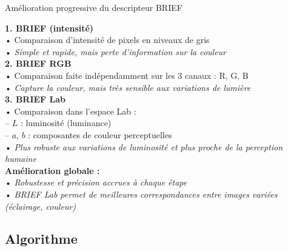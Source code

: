 \begin{frame}{Amélioration progressive du descripteur BRIEF}
\small

\textbf{1. BRIEF (intensité)} \\
\hspace{1em}• Comparaison d’intensité de pixels en niveaux de gris \\
\hspace{1em}• \textit{Simple et rapide, mais perte d'information sur la couleur} \\

\pause
\vspace{0.5em}
\textbf{2. BRIEF RGB} \\
\hspace{1em}• Comparaison faite indépendamment sur les 3 canaux : R, G, B \\
\hspace{1em}• \textit{Capture la couleur, mais très sensible aux variations de lumière} \\

\pause
\vspace{0.5em}
\textbf{3. BRIEF Lab} \\
\hspace{1em}• Comparaison dans l’espace Lab : \\
\hspace{2em}– $L$ : luminosité (luminance) \\
\hspace{2em}– $a$, $b$ : composantes de couleur perceptuelles \\
\hspace{1em}• \textit{Plus robuste aux variations de luminosité et plus proche de la perception humaine} \\

\pause
\vspace{1em}
\textbf{Amélioration globale :} \\
\hspace{1em}• \textit{Robustesse et précision accrues à chaque étape} \\
\hspace{1em}• \textit{BRIEF Lab permet de meilleures correspondances entre images variées (éclairage, couleur)}
\end{frame}

\subsection{Algorithme}

